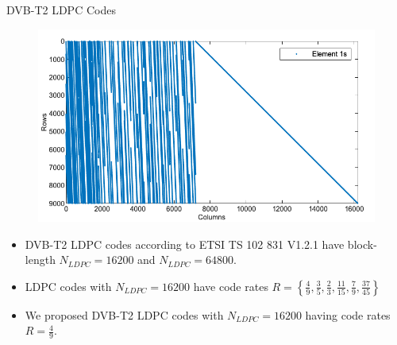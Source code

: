 \documentclass[11pt, aspectratio=169]{beamer}
\begin{document}
\begin{frame}{DVB-T2 LDPC Codes}
\vspace{-1.75cm}
\begin{figure}
\centering 
\includegraphics[scale=0.45]{gambarafa/hs(1-2)-2}
\centering 
\label{sistemmodelMQCLDPC} %
\end{figure}

\begin{itemize}
\item DVB-T2 LDPC codes according to ETSI TS 102 831 V1.2.1 have block-length $N_{LDPC}=16200$ and $N_{LDPC}=64800$.

\item LDPC codes with $N_{LDPC}=16200$ have code rates $R=\left \{ \frac{4}{9}, \frac{3}{5}, \frac{2}{3},\frac{11}{15},\frac{7}{9},\frac{37}{45} \right \}$

\item We proposed DVB-T2 LDPC codes with $N_{LDPC}=16200$ having code rates $R=\frac{4}{9}$.
\end{itemize}

\vspace{-20pt}

\end{frame}
\end{document}
